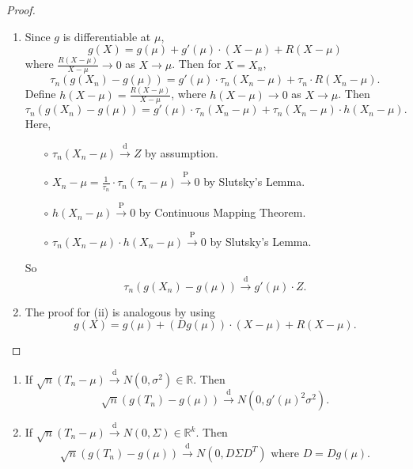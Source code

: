 \documentclass[a4paper]{article}
\begin{document}
\newpage
\begin{proof}
	\quad
	\begin{enumerate}
		\item Since $g$ is differentiable at $\mu$,
		\begin{equation*}
			g(X) = g(\mu) + g'(\mu)\cdot(X-\mu)+R(X-\mu)
		\end{equation*}
		where $\frac{R(X-\mu)}{X-\mu} \to 0$ as $X \to \mu$.
		Then for $X = X_n$,
		\begin{equation}
			\tau_n(g(X_n) - g(\mu)) = g'(\mu) \cdot \tau_n(X_n - \mu) + \tau_n \cdot R(X_n - \mu).
		\end{equation}
		Define $h(X-\mu) = \frac{R(X-\mu)}{X-\mu}$, where $h(X-\mu) \to 0$ as $X \to \mu$. Then
		\begin{equation}
			\tau_n(g(X_n) - g(\mu)) = g'(\mu) \cdot \tau_n(X_n - \mu) + \tau_n (X_n - \mu) \cdot h(X_n -\mu).
		\end{equation}
		Here,
		\begin{itemize}
			\item[$\circ$] $\tau_n(X_n - \mu) \stackrel{\text{d}}{\longrightarrow} Z$ by assumption.
			\item[$\circ$] $X_n - \mu = \frac{1}{\tau_n}\cdot \tau_n(\tau_n - \mu) \stackrel{\text{P}}{\longrightarrow} 0$ by Slutsky's Lemma.
			\item[$\circ$] $h(X_n - \mu) \stackrel{\text{P}}{\longrightarrow} 0$ by Continuous Mapping Theorem.
			\item[$\circ$] $\tau_n (X_n - \mu) \cdot h(X_n -\mu) \stackrel{\text{P}}{\longrightarrow} 0$ by Slutsky's Lemma.
		\end{itemize}
		So
		\begin{equation}
			\tau_n(g(X_n)-g(\mu)) \stackrel{\text{d}}{\longrightarrow} g'(\mu) \cdot Z.
		\end{equation}
		\item The proof for (ii) is analogous by using
		\begin{equation*}
			g(X) = g(\mu) + (Dg(\mu))\cdot(X-\mu)+R(X-\mu).
		\end{equation*}
	\end{enumerate}
\end{proof}

\begin{cor}
	\quad
	\begin{enumerate}
		\item If $\sqrt{n}(T_n - \mu) \stackrel{\text{d}}{\longrightarrow} N(0,\sigma^2) \in \mathbb{R}$. Then
		\begin{equation}
			\sqrt{n}(g(T_n) - g(\mu)) \stackrel{\text{d}}{\longrightarrow} N(0,g'(\mu)^2 \sigma^2).
		\end{equation}
		\item If $\sqrt{n}(T_n - \mu) \stackrel{\text{d}}{\longrightarrow} N(0,\Sigma) \in \mathbb{R}^k$. Then
		\begin{equation}
			\sqrt{n}(g(T_n) - g(\mu)) \stackrel{\text{d}}{\longrightarrow} N(0,D \Sigma D^T) \text{ where } D = Dg(\mu).
		\end{equation}
	\end{enumerate}
\end{cor}
\end{document}
